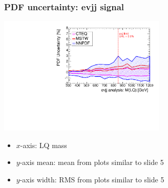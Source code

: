 \documentclass[bigger]{beamer}
\begin{document}
\begin{frame}
\frametitle{PDF uncertainty: evjj signal}
\label{sec-3-1-4}
\label{sec-3-1-4-1}

\centering
\includegraphics[width=0.6\textwidth]{fig/enujj_envelope.pdf}
\label{sec-3-1-4-2}

\centering
\begin{itemize}

\item $x$-axis: LQ mass
\label{sec-3-1-4-2-1}%

\item $y$-axis mean: mean from plots similar to slide 5
\label{sec-3-1-4-2-2}%

\item $y$-axis width: RMS from plots similar to slide 5
\label{sec-3-1-4-2-3}%
\end{itemize} %
\end{frame}
\end{document}
